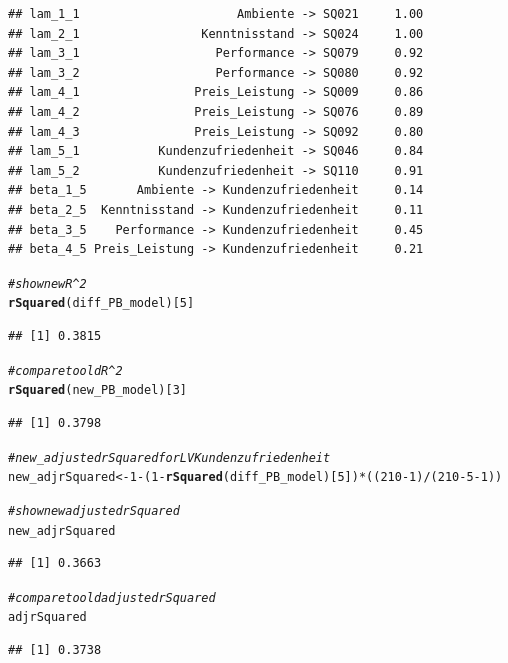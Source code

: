 \documentclass{article}\usepackage[]{graphicx}\usepackage[]{color}
\makeatletter
\newcommand{\hlnum}[1]{\textcolor[rgb]{0.686,0.059,0.569}{#1}}%
\newcommand{\hlcom}[1]{\textcolor[rgb]{0.678,0.584,0.686}{\textit{#1}}}%
\newcommand{\hlopt}[1]{\textcolor[rgb]{0,0,0}{#1}}%
\newcommand{\hlstd}[1]{\textcolor[rgb]{0.345,0.345,0.345}{#1}}%
\newcommand{\hlkwb}[1]{\textcolor[rgb]{0.69,0.353,0.396}{#1}}%
\newcommand{\hlkwd}[1]{\textcolor[rgb]{0.737,0.353,0.396}{\textbf{#1}}}%
\newenvironment{kframe}{%
 \def\at@end@of@kframe{}%
 \ifinner\ifhmode%
  \def\at@end@of@kframe{\end{minipage}}%
  \begin{minipage}{\columnwidth}%
 \fi\fi%
 \def\FrameCommand##1{\hskip\@totalleftmargin \hskip-\fboxsep
 \colorbox{shadecolor}{##1}\hskip-\fboxsep
     \hskip-\linewidth \hskip-\@totalleftmargin \hskip\columnwidth}%
 \MakeFramed {\advance\hsize-\width
   \@totalleftmargin\z@ \linewidth\hsize
   \@setminipage}}%
 {\par\unskip\endMakeFramed%
 \at@end@of@kframe}
\newenvironment{knitrout}{}{} %
\makeatother
\begin{document}
\begin{knitrout}
\begin{kframe}
\begin{verbatim}
## lam_1_1                      Ambiente -> SQ021     1.00
## lam_2_1                 Kenntnisstand -> SQ024     1.00
## lam_3_1                   Performance -> SQ079     0.92
## lam_3_2                   Performance -> SQ080     0.92
## lam_4_1                Preis_Leistung -> SQ009     0.86
## lam_4_2                Preis_Leistung -> SQ076     0.89
## lam_4_3                Preis_Leistung -> SQ092     0.80
## lam_5_1           Kundenzufriedenheit -> SQ046     0.84
## lam_5_2           Kundenzufriedenheit -> SQ110     0.91
## beta_1_5       Ambiente -> Kundenzufriedenheit     0.14
## beta_2_5  Kenntnisstand -> Kundenzufriedenheit     0.11
## beta_3_5    Performance -> Kundenzufriedenheit     0.45
## beta_4_5 Preis_Leistung -> Kundenzufriedenheit     0.21
\end{verbatim}
\begin{alltt}
\hlcom{#show new R^2}
\hlkwd{rSquared}\hlstd{(diff_PB_model)[}\hlnum{5}\hlstd{]}
\end{alltt}
\begin{verbatim}
## [1] 0.3815
\end{verbatim}
\begin{alltt}
\hlcom{#compare to old R^2}
\hlkwd{rSquared}\hlstd{(new_PB_model)[}\hlnum{3}\hlstd{]}
\end{alltt}
\begin{verbatim}
## [1] 0.3798
\end{verbatim}
\begin{alltt}
\hlcom{#new_adjusted rSquared for LV Kundenzufriedenheit}
\hlstd{new_adjrSquared} \hlkwb{<-} \hlnum{1}\hlopt{-}\hlstd{(}\hlnum{1}\hlopt{-}\hlkwd{rSquared}\hlstd{(diff_PB_model)[}\hlnum{5}\hlstd{])}\hlopt{*}\hlstd{((}\hlnum{210}\hlopt{-}\hlnum{1}\hlstd{)}\hlopt{/}\hlstd{(}\hlnum{210}\hlopt{-}\hlnum{5}\hlopt{-}\hlnum{1}\hlstd{))}

\hlcom{#show new adjusted rSquared}
\hlstd{new_adjrSquared}
\end{alltt}
\begin{verbatim}
## [1] 0.3663
\end{verbatim}
\begin{alltt}
\hlcom{#compare to old adjusted rSquared}
\hlstd{adjrSquared}
\end{alltt}
\begin{verbatim}
## [1] 0.3738
\end{verbatim}
\end{kframe}
\end{knitrout}
\end{document}
